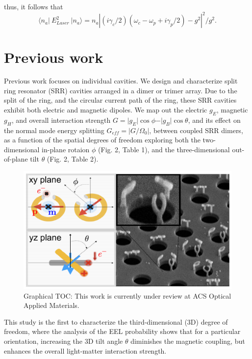 \documentclass[12pt]{article}
\begin{document}
thus, it follows that
\begin{equation}
\langle n_a \vert \: E_{Laser}^2 \: \vert n_a \rangle = n_a
    \left\vert 
    ( i\gamma_c/2 )( \omega_c - \omega_p + i\gamma_p/2 ) -g^2 
    \right\vert^2
    / g^2.
\end{equation}


\section{Previous work}
Previous work focuses on individual cavities. \cite{pakeltis2019focused}
We design and characterize split ring resonator (SRR) cavities arranged 
in a dimer or trimer array. Due to the split of the ring, and the 
circular current path of the ring, these SRR cavities exhibit both 
electric and magnetic dipoles. We map out the electric $g_E$, magnetic 
$g_H$, and overall interaction strength 
$G = \vert g_E \vert \cos\phi - \vert g_B \vert \cos\theta$, 
and its effect on the normal mode energy splitting 
$G_{eff} = \left\vert G/\Omega_0 \right\vert$, between coupled 
SRR dimers, as a function of the spatial degrees of freedom\textemdash
exploring both the two-dimensional in-plane rotaion $\phi$ 
(Fig. 2, Table 1), and the three-dimensional out-of-plane tilt $\theta$ 
(Fig. 2, Table 2).
\begin{figure}[H]
  \begin{center}
    \includegraphics[scale=1.0]{./toc_graphicv4.pdf}
  \end{center}
  \caption{Graphical TOC: This work is currently under review at 
  ACS Optical Applied Materials.}
\end{figure}
This study is the first to characterize the third-dimensional (3D) degree of 
freedom, where the analysis of the EEL probability shows that for a particular
orientation, increasing the 3D tilt angle $\theta$ diminishes the magnetic 
coupling, but enhances the overall light-matter interaction strength. 
\end{document}
